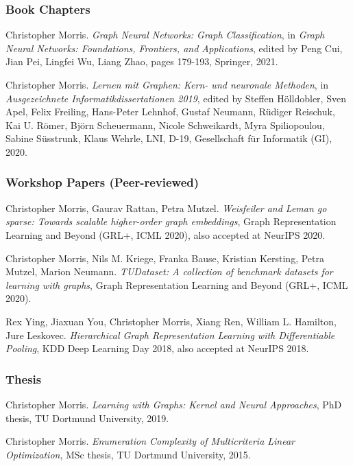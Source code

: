 \documentclass[11pt, a4paper, DIV=12]{scrartcl}
\begin{document}
\begin{thebibliography}{5}
\subsubsection*{Book Chapters}

Christopher Morris.
\emph{Graph Neural Networks: Graph Classification},
in \emph{Graph Neural Networks: Foundations, Frontiers, and Applications}, edited by Peng Cui, Jian Pei, Lingfei Wu, Liang Zhao, pages 179-193, Springer, 2021.

Christopher Morris.
\emph{Lernen mit Graphen: Kern- und neuronale Methoden}, in 
\emph{Ausgezeichnete Informatikdissertationen 2019}, edited by Steffen H{\"o}lldobler, Sven Apel, Felix Freiling, Hans-Peter Lehnhof, Gustaf Neumann, R{\"u}diger Reischuk, Kai U. R{\"o}mer, Bj{\"o}rn Scheuermann, Nicole Schweikardt, Myra Spiliopoulou, Sabine S{\"u}sstrunk, Klaus Wehrle, LNI, D-19, Gesellschaft f{\"u}r Informatik (GI), 2020. 

\subsubsection*{Workshop Papers (Peer-reviewed)}

Christopher Morris, Gaurav Rattan, Petra Mutzel.
\emph{Weisfeiler and Leman go sparse: Towards scalable higher-order graph embeddings},
Graph Representation Learning and Beyond (GRL+, ICML 2020), also accepted at NeurIPS 2020.

Christopher Morris, Nils M. Kriege, Franka Bause, Kristian Kersting, Petra Mutzel, Marion Neumann.
\emph{TUDataset: A collection of benchmark datasets for learning with graphs},
Graph Representation Learning and Beyond (GRL+, ICML 2020).

Rex Ying, Jiaxuan You, Christopher Morris, Xiang Ren, William L. Hamilton, Jure Leskovec.
\emph{Hierarchical Graph Representation Learning with Differentiable Pooling},
KDD Deep Learning Day 2018, also accepted at NeurIPS 2018.

\subsubsection*{Thesis}

Christopher Morris.
\emph{Learning with Graphs: Kernel and Neural Approaches}, PhD thesis, TU Dortmund University, 2019.

Christopher Morris.
\emph{Enumeration Complexity of Multicriteria Linear Optimization}, MSc thesis, TU Dortmund University, 2015.
	

\end{thebibliography}
\end{document}
